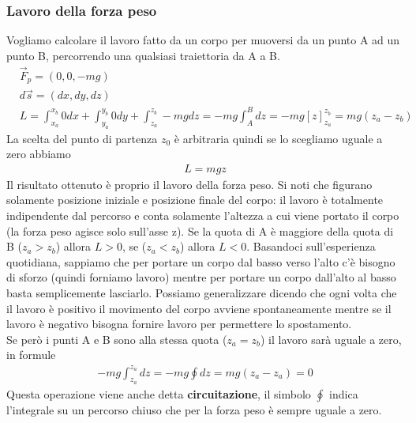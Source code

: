\documentclass[10pt,a4paper]{article}
\begin{document}
\subsubsection{Lavoro della forza peso}
Vogliamo calcolare il lavoro fatto da un corpo per muoversi da un punto A ad un punto B, percorrendo una qualsiasi traiettoria da A a B.
\begin{align*}
&\vec{F}_p = (0,0,-mg)\\
&d\vec{s} = (dx,dy,dz)\\
&L = \int_{x_a}^{x_b} 0 dx+\int_{y_a}^{y_b} 0 dy+\int_{z_a}^{z_b} -mg dz = -mg \int_{A}^{B} dz = -mg[z]_{z_a}^{z_b}= mg(z_a-z_b)
\end{align*}
La scelta del punto di partenza $z_0$ è arbitraria quindi se lo scegliamo uguale a zero abbiamo
\begin{align*}
	L = mgz
\end{align*}
Il risultato ottenuto è proprio il lavoro della forza peso. Si noti che figurano solamente posizione iniziale e posizione finale del corpo: il lavoro è totalmente indipendente dal percorso e conta solamente l'altezza a cui viene portato il corpo (la forza peso agisce solo sull'asse z). Se la quota di A è maggiore della quota di B ($z_a>z_b$) allora $L>0$, se ($z_a<z_b$) allora $L<0$. Basandoci sull'esperienza quotidiana, sappiamo che per portare un corpo dal basso verso l'alto c'è bisogno di sforzo (quindi forniamo lavoro) mentre per portare un corpo dall'alto al basso basta semplicemente lasciarlo. Possiamo generalizzare dicendo che ogni volta che il lavoro è positivo il movimento del corpo avviene spontaneamente mentre se il lavoro è negativo bisogna fornire lavoro per permettere lo spostamento.\\
Se però i punti A e B sono alla stessa quota ($z_a=z_b$) il lavoro sarà uguale a zero, in formule
\begin{align*}
-mg \int_{z_a}^{z_a} dz = -mg \oint dz = mg(z_a-z_a)= 0 
\end{align*}
Questa operazione viene anche detta \textbf{circuitazione}, il simbolo $\oint$ indica l'integrale su un percorso chiuso che per la forza peso è sempre uguale a zero. 
\end{document}
